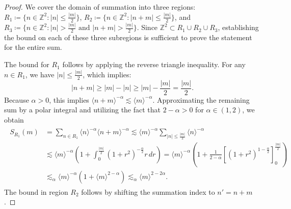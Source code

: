 \begin{proof}
    We cover the domain of summation into three regions: $R_1 \coloneqq \{n \in \mathbb{Z}^2 : |n| \le \frac{|m|}{2}\}$, $R_2 \coloneqq \{n \in \mathbb{Z}^2 : |n+m| \le \frac{|m|}{2}\}$, and $R_3 \coloneqq \{n \in \mathbb{Z}^2 : |n| > \frac{|m|}{2} \text{ and } |n + m| > \frac{|m|}{2}\}$. Since $\mathbb{Z}^2 \subset R_1 \cup R_2 \cup R_3$, establishing the bound on each of these three subregions is sufficient to prove the statement for the entire sum.

    The bound for $R_1$ follows by applying the reverse triangle inequality. For any $n \in R_1$, we have $|n| \le \frac{|m|}{2}$, which implies:
    \begin{equation*}
        |n+m| \ge |m| - |n| \ge |m| - \frac{|m|}{2} = \frac{|m|}{2}.
    \end{equation*}
    Because $\alpha > 0$, this implies $\langle n + m \rangle^{-\alpha} \lesssim \langle m \rangle^{-\alpha}$. Approximating the remaining sum by a polar integral and utilizing the fact that $2 - \alpha > 0$ for $\alpha \in (1, 2)$, we obtain
    \begin{align}\label{S_R1_bound}
        \begin{split}
        S_{R_1}(m) &= \sum_{n \in R_1} \langle n \rangle^{-\alpha}\langle n+m \rangle^{-\alpha} 
        \lesssim \langle m \rangle^{-\alpha} \sum_{|n| \le \frac{|m|}{2}} \langle n \rangle^{-\alpha} \\
        &\lesssim \langle m \rangle^{-\alpha} \left(1+\int_0^{\frac{|m|}{2}} (1 + r^2)^{-\frac{\alpha}{2}} r \, dr \right)
        = \langle m \rangle^{-\alpha} \left(1 + \frac{1}{2 - \alpha} \left[ (1+r^2)^{1-\frac{\alpha}{2}} \right]_{0}^{\frac{|m|}{2}} \right) \\
&\lesssim_\alpha \langle m \rangle^{-\alpha}
    \left(1+\langle m \rangle^{2-\alpha}\right)
\lesssim_\alpha \langle m \rangle^{2-2\alpha}.        
\end{split}
    \end{align}
    The bound in region $R_2$ follows by shifting the summation index to $n' = n+m$. 


\end{proof}
